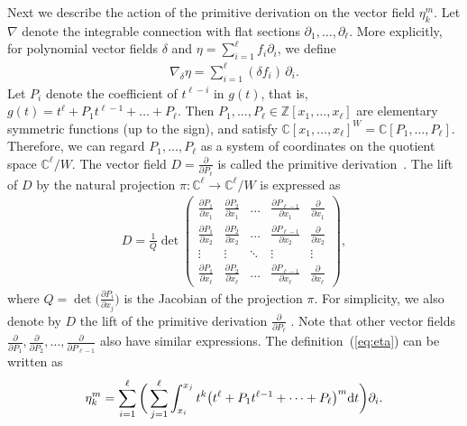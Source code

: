 \documentclass[10pt,a4paper]{amsart}
\numberwithin{equation}{section}
\newcommand{\Z}{\mathbb{Z}}
\newcommand{\C}{\mathbb{C}}
\begin{document}
Next we describe the action of the primitive derivation on the vector field $\eta_k^m$.
Let $\nabla$ denote the integrable connection with flat sections
$\partial_1, \dots, \partial_\ell$. More explicitly, for polynomial
vector fields $\delta$ and $\eta=\sum_{i=1}^\ell f_i\partial_i$, we define
\begin{gather*}
\nabla_\delta\eta=\sum_{i=1}^\ell (\delta f_i)\,\partial_i.
\end{gather*}
Let $P_i$ denote the coefficient of $t^{\ell-i}$ in $g(t)$, that is,
$g(t)=t^\ell+P_1t^{\ell-1}+\dots+P_\ell$. Then $P_1, \dots, P_\ell
\in\Z[x_1, \dots, x_\ell]$ are elementary symmetric functions (up to the sign),
and satisfy $\C[x_1, \dots, x_\ell]^W=\C[P_1, \dots, P_\ell]$. Therefore,
we can regard $P_1, \dots, P_\ell$ as a system of coordinates on the
quotient space $\C^\ell/W$. The vector field $D=\frac{\partial}{\partial P_\ell}$
is called the primitive derivation~\cite{sai-lin, sai-unif}. The lift of $D$ by
the natural projection $\pi\colon \C^\ell\longrightarrow\C^\ell/W$ is
expressed as
\begin{gather*}
D=
\frac{1}{Q}\det
\begin{pmatrix}
\frac{\partial P_1}{\partial x_1}&
\frac{\partial P_2}{\partial x_1}&
\dots &
\frac{\partial P_{\ell-1}}{\partial x_1}&
\frac{\partial}{\partial x_1}
\\[1ex]
\frac{\partial P_1}{\partial x_2}&
\frac{\partial P_2}{\partial x_2}&
\dots &
\frac{\partial P_{\ell-1}}{\partial x_2}&
\frac{\partial}{\partial x_2}
\\
\vdots&\vdots&\ddots&\vdots&\vdots
\\
\frac{\partial P_1}{\partial x_\ell}&
\frac{\partial P_2}{\partial x_\ell}&
\dots &
\frac{\partial P_{\ell-1}}{\partial x_\ell}&
\frac{\partial}{\partial x_\ell}
\end{pmatrix}\!,
\end{gather*}
where $Q=\det\big(\frac{\partial P_i}{\partial x_j}\big)$ is the Jacobian of the projection
$\pi$. For simplicity, we also denote by $D$ the lift of the primitive derivation
$\frac{\partial}{\partial P_\ell}$ . Note that other vector fields
$\frac{\partial}{\partial P_1}, \frac{\partial}{\partial P_2}, \dots,
\frac{\partial}{\partial P_{\ell-1}}$ also have similar expressions.
The definition~(\ref{eq:eta}) can be written as
\begin{gather*}
\eta_k^m=\sum_{i=1}^\ell\bigg(\sum_{j=1}^\ell
\int_{x_i}^{x_j}t^k\big(t^\ell+P_1t^{\ell-1}+\dots +P_\ell\big)^m {\rm d}t\bigg)\partial_i.
\end{gather*}
\end{document}
